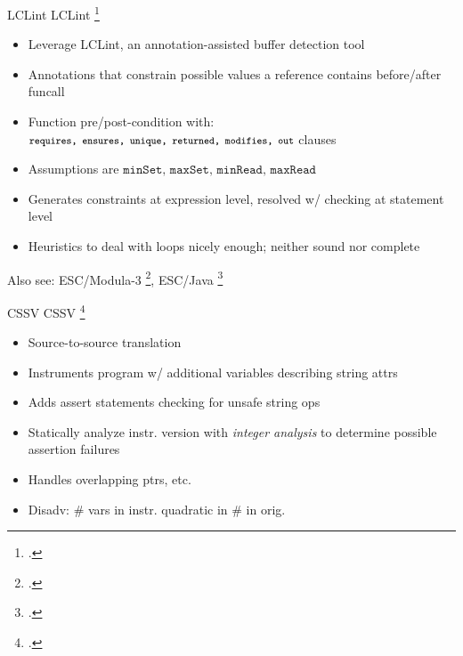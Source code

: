 \begin{frame}{LCLint}
LCLint \footcite{larochelle_statically_2001}
\begin{itemize}
    \item Leverage LCLint, an annotation-assisted buffer detection tool
    \item Annotations that constrain possible values a reference contains before/after funcall
    \item Function pre/post-condition with: $\footnotesize{\texttt{requires, ensures, unique, returned, modifies, out}}$ clauses
    \item Assumptions are $\texttt{minSet, maxSet, minRead, maxRead}$
    \item Generates constraints at expression level, resolved w/ checking at statement level
    \item Heuristics to deal with loops nicely enough; neither sound nor complete
\end{itemize}
    Also see: ESC/Modula-3 \footcite{detlefs_overview_1995}, ESC/Java \footcite{flanagan_extended_2002}
    \vspace{0.2in}
\end{frame}

\begin{frame}{CSSV}
CSSV \footcite{dor_cssv:_2003}
\begin{itemize}
    \item Source-to-source translation
    \item Instruments program w/ additional variables describing string attrs
    \item Adds assert statements checking for unsafe string ops
    \item Statically analyze instr. version with \emph{integer analysis} to determine possible assertion failures
    \item Handles overlapping ptrs, etc.
    \item Disadv: \# vars in instr. quadratic in \# in orig.
\end{itemize}
\end{frame}

